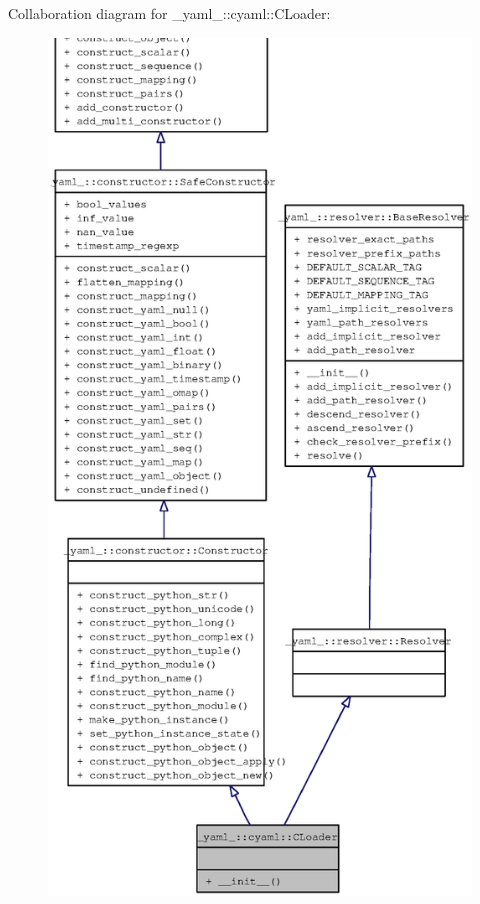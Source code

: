 Collaboration diagram for \_\-yaml\_\-::cyaml::CLoader:\nopagebreak
\begin{figure}[H]
\begin{center}
\leavevmode
\includegraphics[width=400pt]{class__yaml___1_1cyaml_1_1CLoader__coll__graph}
\end{center}
\end{figure}
